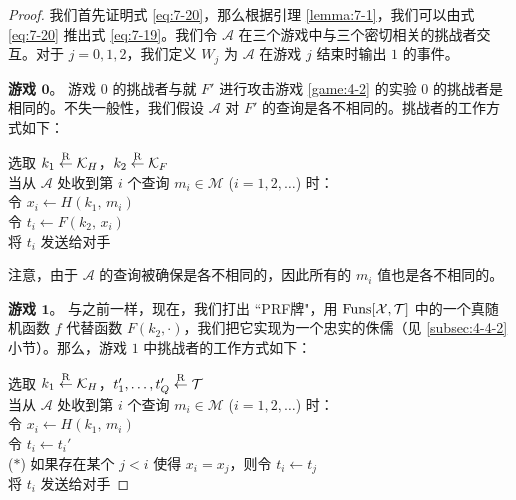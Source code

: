 \begin{proof}
我们首先证明式 \ref{eq:7-20}，那么根据引理 \ref{lemma:7-1}，我们可以由式 \ref{eq:7-20} 推出式 \ref{eq:7-19}。我们令 $\mathcal{A}$ 在三个游戏中与三个密切相关的挑战者交互。对于 $j=0,1,2$，我们定义 $W_j$ 为 $\mathcal{A}$ 在游戏 $j$ 结束时输出 $1$ 的事件。

\vspace{5pt}

\noindent\textbf{游戏 $\mathbf{0}$}。
游戏 $0$ 的挑战者与就 $F'$ 进行攻击游戏 \ref{game:4-2} 的实验 $0$ 的挑战者是相同的。不失一般性，我们假设 $\mathcal{A}$ 对 $F'$ 的查询是各不相同的。挑战者的工作方式如下：

\vspace{5pt}

\hspace*{5pt} 选取 $k_1\overset{\rm R}\leftarrow\mathcal{K}_H$，$k_2\overset{\rm R}\leftarrow\mathcal{K}_F$\\
\hspace*{26pt} 当从 $\mathcal{A}$ 处收到第 $i$ 个查询 $m_i\in\mathcal{M}$ ($i=1,2,\dots$) 时：\\
\hspace*{50pt} 令 $x_i\leftarrow H(k_1,\,m_i)$\\
\hspace*{50pt} 令 $t_i\leftarrow F(k_2,\,x_i)$\\
\hspace*{50pt} 将 $t_i$ 发送给对手

\vspace{5pt}

\noindent
注意，由于 $\mathcal{A}$ 的查询被确保是各不相同的，因此所有的 $m_i$ 值也是各不相同的。

\vspace{5pt}

\noindent\textbf{游戏 $\mathbf{1}$}。
与之前一样，现在，我们打出 ``PRF牌"，用 ${\rm Funs}[\mathcal{X},\mathcal{T}]$ 中的一个真随机函数 $f$ 代替函数 $F(k_2,\cdot)$，我们把它实现为一个忠实的侏儒（见 \ref{subsec:4-4-2} 小节）。那么，游戏 $1$ 中挑战者的工作方式如下：

\vspace{5pt}

\hspace*{5pt} 选取 $k_1\overset{\rm R}\leftarrow\mathcal{K}_H$，$t_1',\dots,t_Q'\overset{\rm R}\leftarrow\mathcal{T}$\\
\hspace*{26pt} 当从 $\mathcal{A}$ 处收到第 $i$ 个查询 $m_i\in\mathcal{M}$ ($i=1,2,\dots$) 时：\\
\hspace*{50pt} 令 $x_i\leftarrow H(k_1,\,m_i)$\\
\hspace*{50pt} 令 $t_i\leftarrow t_i'$\\
\hspace*{1pt} ($*$)
\hspace*{28pt} 如果存在某个 $j<i$ 使得 $x_i=x_j$，则令 $t_i\leftarrow t_j$\\
\hspace*{50pt} 将 $t_i$ 发送给对手


\end{proof}
